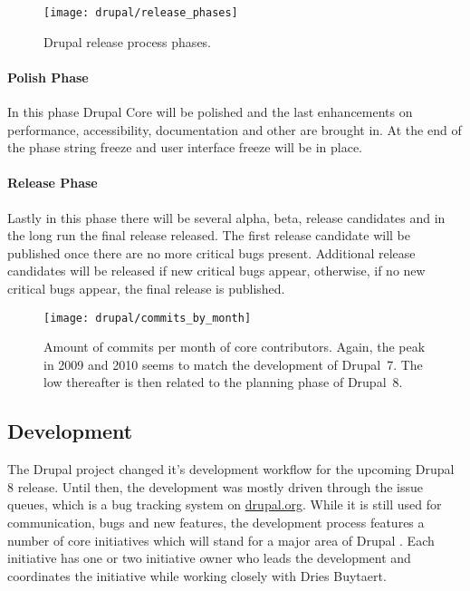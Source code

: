 \begin{figure}[htbp]
  \centering
  \texttt{[image: drupal/release\_phases]}
  \caption{Drupal release process phases.}
\end{figure}

\paragraph{Polish Phase}

In this phase Drupal Core will be polished and the last enhancements on
performance, accessibility, documentation and other are brought in. At the end
of the phase string freeze and user interface freeze will be in place.

\paragraph{Release Phase}

Lastly in this phase there will be several alpha, beta, release candidates and
in the long run the final release released. The first release candidate will be
published once there are no more critical bugs present. Additional release
candidates will be released if new critical bugs appear, otherwise, if no new
critical bugs appear, the final release is published.

\begin{figure}[htbp]
  \centering
  \texttt{[image: drupal/commits\_by\_month]}
  \caption{Amount of commits per month of core contributors. Again, the peak in
  2009 and 2010 seems to match the development of Drupal~7. The low thereafter
  is then related to the planning phase of Drupal~8.}
\end{figure}


\subsection{Development} %

The Drupal project changed it's development workflow for the upcoming Drupal 8
release. Until then, the development was mostly driven through the issue
queues, which is a bug tracking system on \url{drupal.org}. While it is still
used for communication, bugs and new features, the development process features
a number of core initiatives which will stand for a major area of Drupal
\cite{DrupalInitiatives}. Each initiative has one or two initiative owner who
leads the development and coordinates the initiative while working closely with
Dries Buytaert.


